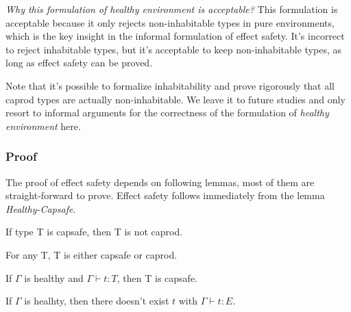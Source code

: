 \emph{Why this formulation of healthy environment is acceptable?} This
formulation is acceptable because it only rejects non-inhabitable
types in pure environments, which is the key insight in the informal
formulation of effect safety. It's incorrect to reject inhabitable
types, but it's acceptable to keep non-inhabitable types, as long as
effect safety can be proved.

Note that it's possible to formalize inhabitability and prove
rigorously that all caprod types are actually non-inhabitable. We
leave it to future studies and only resort to informal arguments for
the correctness of the formulation of \emph{healthy environment} here.

\subsubsection{Proof}

The proof of effect safety depends on following lemmas, most of them
are straight-forward to prove. Effect safety follows immediately from
the lemma \emph{Healthy-Capsafe}.


\begin{lemma}
 If type T is capsafe, then T is not caprod.
\end{lemma}

\begin{lemma}
 For any T, T is either capsafe or caprod.
\end{lemma}



\begin{lemma}
  If $\Gamma$ is healthy and $\Gamma \vdash t : T$, then T is capsafe.
\end{lemma}

\begin{theorem}
  If $\Gamma$ is healhty, then there doesn't exist $t$ with
  $\Gamma \vdash t : E$.
\end{theorem}


